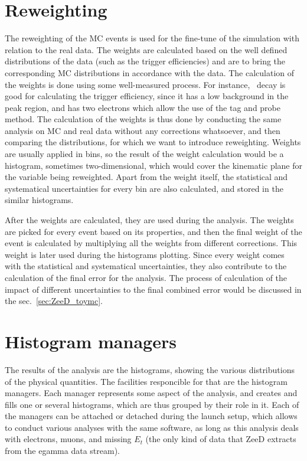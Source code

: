 \section{Reweighting}

The reweighting of the MC events is used for the fine-tune of the simulation with relation to the real data. The weights are calculated based on the well defined distributions of the data (such as the trigger efficiencies) and are to bring the corresponding MC distributions in accordance with the data. The calculation of the weights is done using some well-measured process. For instance, \Zee\ decay is good for calculating the trigger efficiency, since it has a low background in the peak region, and has two electrons which allow the use of the tag and probe method. The calculation of the weights is thus done by conducting the same analysis on MC and real data without any corrections whatsoever, and then comparing the distributions, for which we want to introduce reweighting. Weights are usually applied in bins, so the result of the weight calculation would be a histogram, sometimes two-dimensional, which would cover the kinematic plane for the variable being reweighted. Apart from the weight itself, the statistical and systematical uncertainties for every bin are also calculated, and stored in the similar histograms.

After the weights are calculated, they are used during the analysis. The weights are picked for every event based on its properties, and then the final weight of the event is calculated by multiplying all the weights from different corrections. This weight is later used during the histograms plotting. Since every weight comes with the statistical and systematical uncertainties, they also contribute to the calculation of the final error for the analysis. The process of calculation of the impact of different uncertainties to the final combined error would be discussed in the sec.~\ref{sec:ZeeD_toymc}.

\section{Histogram managers}

The results of the analysis are the histograms, showing the various distributions of the physical quantities. The facilities responcible for that are the histogram managers. Each manager represents some aspect of the analysis, and creates and fills one or several histograms, which are thus grouped by their role in it. Each of the managers can be attached or detached during the launch setup, which allows to conduct various analyses with the same software, as long as this analysis deals with electrons, muons, and missing $E_{t}$ (the only kind of data that ZeeD extracts from the egamma data stream).


